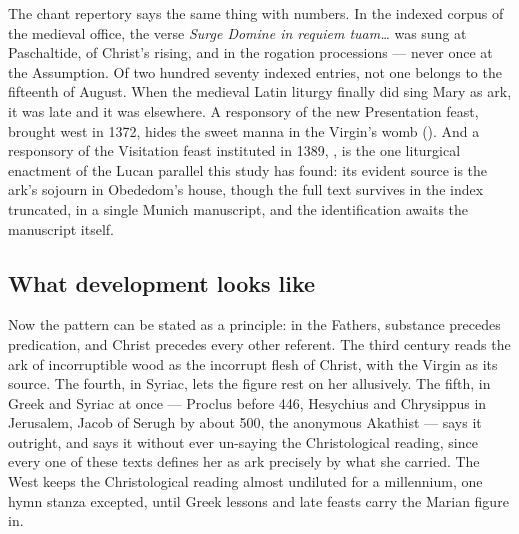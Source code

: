 The chant repertory says the same thing with numbers. In the indexed
corpus of the medieval office, the verse \emph{Surge Domine
in requiem tuam\ldots} was sung at Paschaltide, of Christ's rising,
and in the rogation processions --- never once at the Assumption. Of
two hundred seventy indexed  entries, not one belongs to
the fifteenth of August. When the medieval Latin liturgy finally did
sing Mary as ark, it was late and it was elsewhere. A responsory of
the new Presentation feast, brought west in 1372, hides the sweet
manna in the Virgin's womb (). And a
responsory of the Visitation feast instituted in 1389, , is the one liturgical enactment of the Lucan parallel
this study has found: its evident source is the ark's sojourn in
Obededom's house, though the full text survives in the index
truncated, in a single Munich manuscript, and the identification
awaits the manuscript itself.

\subsection{What development looks like}

Now the pattern can be stated as a principle: in the Fathers,
substance precedes predication, and Christ precedes every other
referent. The third century reads the ark of incorruptible wood as
the incorrupt flesh of Christ, with the Virgin as its source. The
fourth, in Syriac, lets the figure rest on her allusively. The fifth,
in Greek and Syriac at once --- Proclus before 446, Hesychius and
Chrysippus in Jerusalem, Jacob of Serugh by about 500, the anonymous
Akathist --- says it outright, and says it without ever un-saying the
Christological reading, since every one of these texts defines her as
ark precisely by what she carried. The West keeps the Christological
reading almost undiluted for a millennium, one hymn stanza excepted,
until Greek lessons and late feasts carry the Marian figure in.


